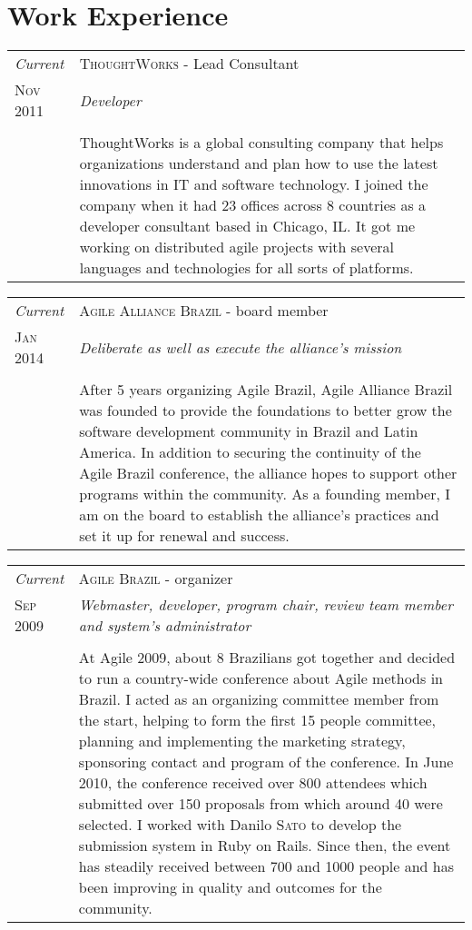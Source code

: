 \documentclass[letter,10pt]{article}
\begin{document}
\section{Work Experience}

\begin{tabular}{p{2.5cm}|p{13.5cm}}
  \emph{Current} & \textsc{ThoughtWorks} - Lead Consultant\\
  \textsc{Nov 2011}& \emph{Developer}\\
  &\\
  &ThoughtWorks is a global consulting company that helps organizations understand and plan how to use the latest innovations in IT and software technology. I joined the company when it had 23 offices across 8 countries as a developer consultant based in Chicago, IL. It got me working on distributed agile projects with several languages and technologies for all sorts of platforms.
\end{tabular}

\begin{tabular}{p{2.5cm}|p{13.5cm}}
  \emph{Current} & \textsc{Agile Alliance Brazil} - board member\\
  \textsc{Jan 2014}& \emph{Deliberate as well as execute the alliance's mission}\\
  &\\
  & After 5 years organizing Agile Brazil, Agile Alliance Brazil
  was founded to provide the foundations to better grow the software
  development community in Brazil and Latin America. In addition to
  securing the continuity of the Agile Brazil conference, the alliance
  hopes to support other programs within the community. As a founding
  member, I am on the board to establish the alliance's practices
  and set it up for renewal and success.
\end{tabular}

\begin{tabular}{p{2.5cm}|p{13.5cm}}
  \emph{Current} & \textsc{Agile Brazil} - organizer\\
  \textsc{Sep 2009}& \emph{Webmaster, developer, program chair, review team
    member and system's administrator}\\
  &\\
  &At Agile 2009, about 8 Brazilians got together and
  decided to run a country-wide conference about Agile methods in
  Brazil. I acted as an organizing committee member from the start,
  helping to form the first 15 people committee, planning and implementing
  the marketing strategy, sponsoring contact and program of the conference.
  In June 2010, the conference received over 800 attendees which
  submitted over 150 proposals from which around 40 were selected. I
  worked with Danilo \textsc{Sato} to develop the submission system
  in Ruby on Rails. Since then, the event has steadily received between 700
  and 1000 people and has been improving in quality and outcomes for the
  community.
\end{tabular}
\end{document}
